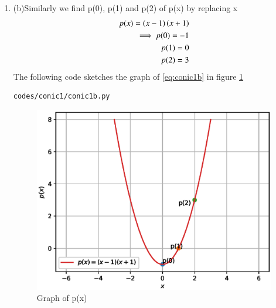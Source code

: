 \begin{enumerate}[label=\thesection.\arabic*.,ref=\thesection.\theenumi]
\item (b)Similarly we find p(0), p(1) and p(2) of p(x) by replacing x
\begin{align}
\label{eq:conic1b}
 p(x) = \left(x-1\right)\left(x+1\right)
\\
\implies p(0) =-1
\\
p(1) = 0
\\
p(2) = 3
\end{align}
The following code sketches the graph of \ref{eq:conic1b} in figure \ref{fig:conic1b}
\begin{lstlisting}
codes/conic1/conic1b.py
\end{lstlisting}
\begin{figure}[!ht]
\centering
\includegraphics[width=\columnwidth]{./codes/conic1/pyfigs/conic1b.eps}
\caption{Graph of p(x)}
\label{fig:conic1b}
\end{figure}

\end{enumerate}
